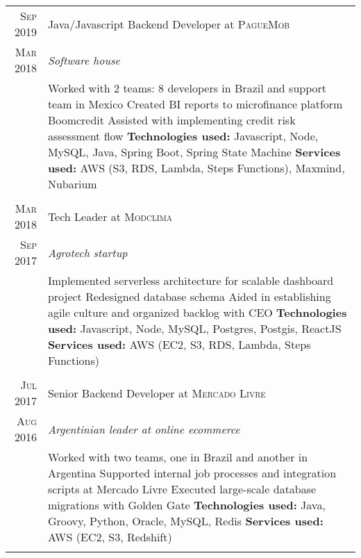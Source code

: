 \documentclass[a4paper,10pt]{article}
\begin{document}
\begin{tabular}{r|p{11cm}}
 \textsc{ Sep 2019 } & Java/Javascript Backend Developer at \textsc{PagueMob} \\\textsc{Mar 2018}&\emph{Software house }\\&\footnotesize{
  Worked with 2 teams: 8 developers in Brazil and support team in Mexico \newline
  Created BI reports to microfinance platform Boomcredit \newline
  Assisted with implementing credit risk assessment flow \newline
\textbf{Technologies used:} Javascript, Node, MySQL, Java, Spring Boot, Spring State Machine\newline
\textbf{Services used:} AWS (S3, RDS, Lambda, Steps Functions), Maxmind, Nubarium }\\\multicolumn{2}{c}{} \\

 \textsc{ Mar 2018 } & Tech Leader at \textsc{Modclima} \\\textsc{Sep 2017}&\emph{Agrotech startup }\\&\footnotesize{
  Implemented serverless architecture for scalable dashboard project\newline
  Redesigned database schema\newline
  Aided in establishing agile culture and organized backlog with CEO\newline
\textbf{Technologies used:} Javascript, Node, MySQL, Postgres, Postgis, ReactJS\newline
\textbf{Services used:} AWS (EC2, S3, RDS, Lambda, Steps Functions)}\\\multicolumn{2}{c}{} \\

 \textsc{Jul 2017} & Senior Backend Developer at \textsc{Mercado Livre} \\\textsc{Aug 2016}&\emph{Argentinian leader at online ecommerce }\\&\footnotesize{
  Worked with two teams, one in Brazil and another in Argentina\newline
  Supported internal job processes and integration scripts at Mercado Livre\newline
  Executed large-scale database migrations with Golden Gate\newline
\textbf{Technologies used:} Java, Groovy, Python, Oracle, MySQL, Redis\newline
\textbf{Services used:} AWS (EC2, S3, Redshift)}\\\multicolumn{2}{c}{} \\
 
 \end{tabular}
 
\end{document}

